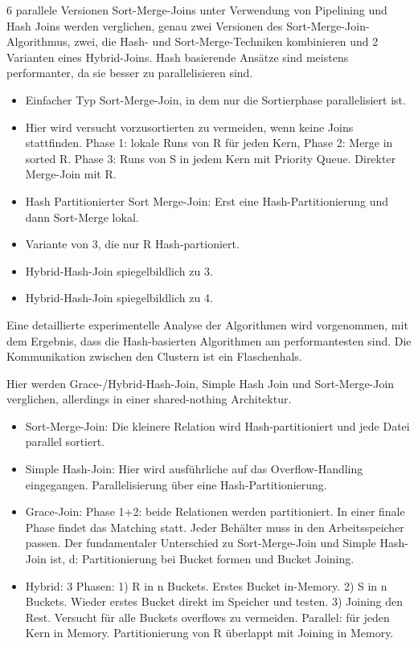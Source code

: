 \documentclass[a4paper,12pt,twoside]{article}
\begin{document}
\textbf{}

6 parallele Versionen Sort-Merge-Joins unter Verwendung von Pipelining und Hash Joins werden verglichen, genau zwei Versionen des Sort-Merge-Join-Algorithmus, zwei, die Hash- und Sort-Merge-Techniken kombinieren und 2 Varianten eines Hybrid-Joins. Hash basierende Ansätze sind meistens performanter, da sie besser zu parallelisieren sind.

\begin{itemize}
	\item Einfacher Typ Sort-Merge-Join, in dem nur die Sortierphase parallelisiert ist.
	\item Hier wird versucht vorzusortierten zu vermeiden, wenn keine Joins stattfinden. Phase 1: lokale Runs von R für jeden Kern, Phase 2: Merge in sorted R. Phase 3: Runs von S in jedem Kern mit Priority Queue. Direkter Merge-Join mit R.
	\item Hash Partitionierter Sort Merge-Join: Erst eine Hash-Partitionierung und dann Sort-Merge lokal.
	\item Variante von 3, die nur R Hash-partioniert.
	\item Hybrid-Hash-Join spiegelbildlich zu 3.
	\item Hybrid-Hash-Join spiegelbildlich zu 4.
\end{itemize}

Eine detaillierte experimentelle Analyse der Algorithmen wird vorgenommen, mit dem Ergebnis, dass die Hash-basierten Algorithmen am performantesten sind. Die Kommunikation zwischen den Clustern ist ein Flaschenhals.

\textbf{}

Hier werden Grace-/Hybrid-Hash-Join, Simple Hash Join und Sort-Merge-Join verglichen, allerdings in einer shared-nothing Architektur.

\begin{itemize}
	\item Sort-Merge-Join: Die kleinere Relation wird Hash-partitioniert und jede Datei parallel sortiert. 
	\item Simple Hash-Join: Hier wird ausführliche auf das Overflow-Handling eingegangen. Parallelisierung über eine Hash-Partitionierung.
	\item Grace-Join: Phase 1+2: beide Relationen werden partitioniert. In einer finale Phase findet das Matching statt. Jeder Behälter muss in den Arbeitsspeicher passen. Der fundamentaler Unterschied zu Sort-Merge-Join und Simple Hash-Join ist, d: Partitionierung bei Bucket formen und Bucket Joining.
	\item Hybrid: 3 Phasen: 1) R in n Buckets. Erstes Bucket in-Memory. 2) S in n Buckets. Wieder erstes Bucket direkt im Speicher und testen. 3) Joining den Rest. Versucht für alle Buckets overflows zu vermeiden. Parallel: für jeden Kern in Memory. Partitionierung von R überlappt mit Joining in Memory.
\end{itemize}
\end{document}
